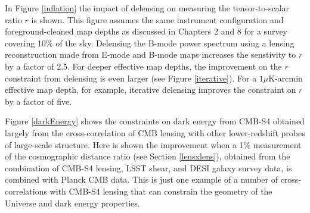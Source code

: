 In Figure \ref{inflation} the impact of delensing on measuring the tensor-to-scalar ratio $r$ is shown.  This figure assumes the same instrument configuration and foreground-cleaned map depths as discussed in Chapters 2 and 8 for a survey covering 10\% of the sky.  Delensing the B-mode power spectrum using a lensing reconstruction made from E-mode and B-mode maps increases the senstivity to $r$ by a factor of 2.5.  For deeper effective map depths, the improvement on the $r$ constraint from delensing is even larger (see Figure \ref{iterative}).  For a $1 \mu $K-arcmin effective map depth, for example, iterative delensing improves the constraint on $r$ by a factor of five.  

Figure \ref{darkEnergy} shows the constraints on dark energy from CMB-S4 obtained largely from the cross-correlation of CMB lensing with other lower-redshift probes of large-scale structure.  Here is shown the improvement when a 1\% measurement of the cosmographic distance ratio (see Section \ref{lensxlens}), obtained from the combination of CMB-S4 lensing, LSST shear, and DESI galaxy survey data, is combined with Planck CMB data.  This is just one example of a number of cross-correlations with CMB-S4 lensing that can constrain the geometry of the Universe and dark energy properties.


%

%

